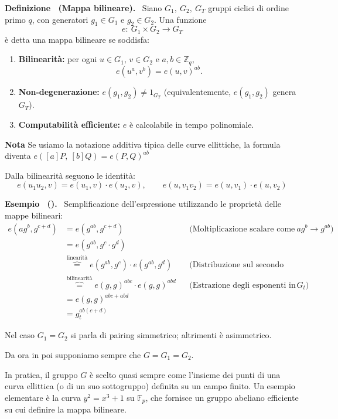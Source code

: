 \documentclass[a4paper, 11pt]{article}
\newenvironment{example}[1][]{
  \par\noindent\textbf{Esempio%
  \if\relax\detokenize{#1}\relax\else\ (\textbf{#1})\fi.}\ }{}
\newenvironment{definition}[1][]{
  \par\noindent\textbf{Definizione%
  \if\relax\detokenize{#1}\relax\else\ (\textbf{#1})\fi.}\ }{}
\begin{document}
\begin{definition}[Mappa bilineare]
Siano $G_1,\ G_2,\ G_T$ gruppi ciclici di ordine primo $q$, con generatori $g_1\in G_1$ e $g_2\in G_2$. Una funzione
\[
e:\ G_1\times G_2 \to G_T
\]
è detta una mappa bilineare se soddisfa:
\begin{enumerate}[itemsep=2pt, topsep=2pt]
    \item \textbf{Bilinearità:} per ogni $u\in G_1$, $v\in G_2$ e $a,b\in\mathbb{Z}_q$,
    \[
        e(u^a, v^b)=e(u,v)^{ab}.
    \]
    \item \textbf{Non-degenerazione:} $e(g_1,g_2)\neq 1_{G_T}$ (equivalentemente, $e(g_1,g_2)$ genera $G_T$).
    \item \textbf{Computabilità efficiente:} $e$ è calcolabile in tempo polinomiale.
\end{enumerate}
\end{definition}

\textbf{Nota}
Se usiamo la notazione additiva tipica delle curve ellittiche, la formula diventa $e([a]P,\ [b]Q)=e(P, Q)^{ab}$

Dalla bilinearità seguono le identità:
\[
    e(u_1u_2,v) = e(u_1,v) \cdot e(u_2,v), \qquad e(u,v_1v_2) = e(u,v_1) \cdot e(u,v_2)
\]

\begin{example}
    Semplificazione dell'espressione utilizzando le proprietà delle mappe bilineari:
    \begin{align*}
        e(ag^b, g^{c+d}) 
        &= e(g^{ab}, g^{c+d}) && \text{(Moltiplicazione scalare come esponente: } ag^b \to g^{ab}\text{)} \\
        &= e(g^{ab}, g^c \cdot g^d) \\
        &\overbrace{=}^{\text{linearità}} e(g^{ab}, g^c) \cdot e(g^{ab}, g^d) && \text{(Distribuzione sul secondo argomento)} \\
        &\overbrace{=}^{\text{bilinearità}} e(g, g)^{abc} \cdot e(g, g)^{abd} && \text{(Estrazione degli esponenti in } G_t\text{)} \\
        &= e(g, g)^{abc + abd} \\
        &= g_t^{ab(c+d)} 
    \end{align*}
\end{example}

Nel caso $G_1=G_2$ si parla di pairing simmetrico; altrimenti è asimmetrico.

Da ora in poi supponiamo sempre che $G = G_1 = G_2$.


In pratica, il gruppo $G$ è scelto quasi sempre come l'insieme dei punti di una curva ellittica (o di un suo sottogruppo) definita su un campo finito. Un esempio elementare è la curva
$y^2 = x^3 + 1$
su $\mathbb{F}_p$, che fornisce un gruppo abeliano efficiente su cui definire la mappa bilineare.
\end{document}
